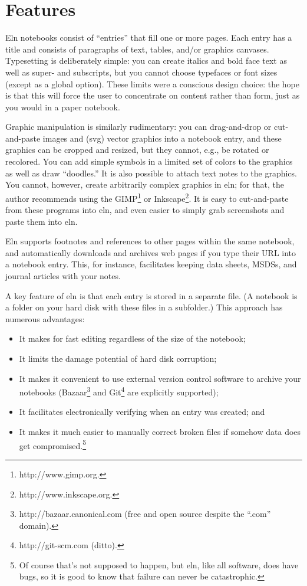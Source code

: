 \documentclass[11pt]{report}
\begin{document}
\section{Features}

Eln notebooks consist of ``entries'' that fill one or more pages.
Each entry has a title and consists of paragraphs of text, tables, and/or
graphics canvases. Typesetting is deliberately simple: you can create italics
and bold face text as well as super- and subscripts, but you cannot
choose typefaces or font sizes (except as a global option). These
limits were a conscious design choice: the hope is that this will
force the user to concentrate on content rather than form, just as you
would in a paper notebook.

Graphic manipulation is similarly rudimentary: you can drag-and-drop
or cut-and-paste images and (svg) vector graphics into a notebook
entry, and these graphics can be cropped and resized, but they cannot,
e.g., be rotated or recolored. You can add simple symbols in a limited
set of colors to the graphics as well as draw ``doodles.'' It is also
possible to attach text notes to the graphics. You cannot, however,
create arbitrarily complex graphics in eln; for that, the author
recommends using the GIMP\footnote{http://www.gimp.org.} or
Inkscape\footnote{http://www.inkscape.org.}. It is easy to
cut-and-paste from these programs into eln, and even easier to simply
grab screenshots and paste them into eln.

Eln supports footnotes and references to other pages within the same
notebook, and automatically downloads and archives web pages if you
type their URL into a notebook entry. This, for instance, facilitates
keeping data sheets, MSDSs, and journal articles with your notes.

A key feature of eln is that each entry is stored in a separate
file. (A notebook is a folder on your hard disk with these files in a
subfolder.) This approach has numerous advantages:
\begin{itemize}
  \item It makes for fast
editing regardless of the size of the notebook;
\item It limits the damage
potential of hard disk corruption;
\item It makes it convenient to use
external version control software to archive your notebooks
(Bazaar\footnote{http://bazaar.canonical.com (free and open source despite the
  ``.com'' domain).} and
Git\footnote{http://git-scm.com (ditto).} are
explicitly supported);
\item It facilitates electronically verifying when an
entry was created; and
\item It makes it much easier to manually correct
broken files if somehow data does get compromised.\footnote{Of course
  that's not supposed to happen, but eln, like all software, does have
  bugs, so it is good to know that failure can never be catastrophic.}
\end{itemize}
\end{document}
